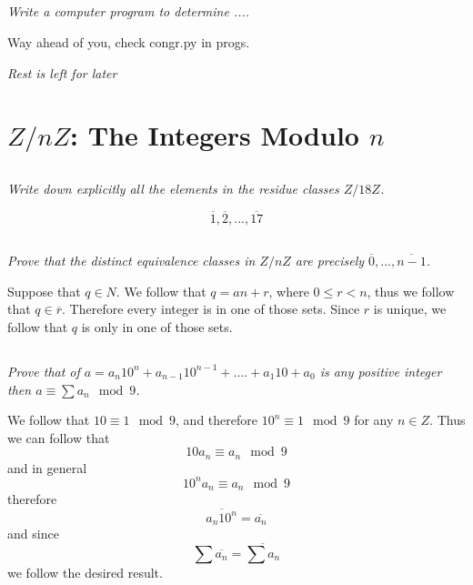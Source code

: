 \documentclass[11pt,oneside,titlepage]{book}
\begin{document}
\subsection{}

\textit{Write a computer program to determine ....}

Way ahead of you, check congr.py in progs.

\textit{Rest is left for later}

\section{$Z/n Z$: The Integers Modulo $n$}

\subsection{}
\textit{Write down explicitly all the elements in the residue classes $Z/18Z$.}

$$\overline{1}, \overline{2}, ... , \overline{17}$$

\subsection{}

\textit{Prove that the distinct equivalence classes in $Z/nZ$ are precisely
  $\overline{0}, ..., \overline{n - 1}$.}

Suppose that $q \in N$. We follow that $q = an + r$, where $0 \leq r < n$, thus we follow that
$q \in \overline{r}$. Therefore every integer is in one of those sets. Since $r$ is
unique, we follow that $q$ is only in one of those sets.

\subsection{}

\textit{Prove that of $a = a_n 10^n + a_{n - 1}10 ^{n - 1} + .... + a_1 10 + a_0$ is any positive
  integer then $a \equiv \sum{a_n} \mod 9$.}

We follow that $10 \equiv 1 \mod 9$, and therefore $10^n \equiv 1 \mod 9$ for any $n \in Z$.
Thus we can follow that
$$10 a_n \equiv a_n \mod 9$$
and in general
$$10^n a_n \equiv a_n \mod 9$$
therefore
$$\overline{a_n 10^n} = \overline{a_n}$$
and since
$$\sum {\overline{a_n}} = \overline{\sum a_n}$$
we follow the desired result.

\subsection{}
\end{document}
